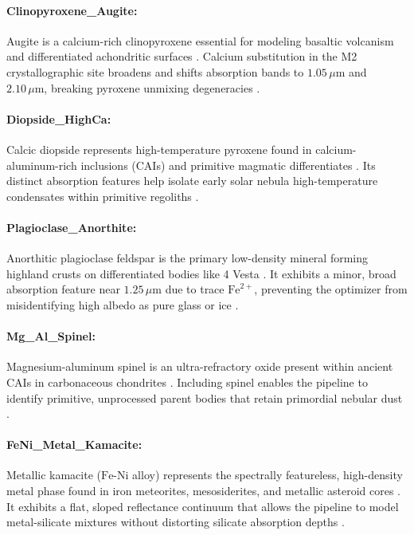 \documentclass[11pt,a4paper]{article}
\begin{document}
\paragraph{Clinopyroxene\_Augite:} Augite is a calcium-rich clinopyroxene essential for modeling basaltic volcanism and differentiated achondritic surfaces \cite{Cameron1973}. Calcium substitution in the M2 crystallographic site broadens and shifts absorption bands to $1.05\,\mu\text{m}$ and $2.10\,\mu\text{m}$, breaking pyroxene unmixing degeneracies \cite{Burns1993, Cloutis1986}.

\paragraph{Diopside\_HighCa:} Calcic diopside represents high-temperature pyroxene found in calcium-aluminum-rich inclusions (CAIs) and primitive magmatic differentiates \cite{Deer2013}. Its distinct absorption features help isolate early solar nebula high-temperature condensates within primitive regoliths \cite{Alexander2007}.

\paragraph{Plagioclase\_Anorthite:} Anorthitic plagioclase feldspar is the primary low-density mineral forming highland crusts on differentiated bodies like 4 Vesta \cite{Deer2013, Russell2012}. It exhibits a minor, broad absorption feature near $1.25\,\mu\text{m}$ due to trace $\text{Fe}^{2+}$, preventing the optimizer from misidentifying high albedo as pure glass or ice \cite{Burns1993, Crown1987}.

\paragraph{Mg\_Al\_Spinel:} Magnesium-aluminum spinel is an ultra-refractory oxide present within ancient CAIs in carbonaceous chondrites \cite{Alexander2007}. Including spinel enables the pipeline to identify primitive, unprocessed parent bodies that retain primordial nebular dust \cite{Alexander2007}.

\paragraph{FeNi\_Metal\_Kamacite:} Metallic kamacite ($\text{Fe}\text{-}\text{Ni}$ alloy) represents the spectrally featureless, high-density metal phase found in iron meteorites, mesosiderites, and metallic asteroid cores \cite{Buchwald1975}. It exhibits a flat, sloped reflectance continuum that allows the pipeline to model metal-silicate mixtures without distorting silicate absorption depths \cite{Gaffey1993, Britt2003}.
\end{document}
